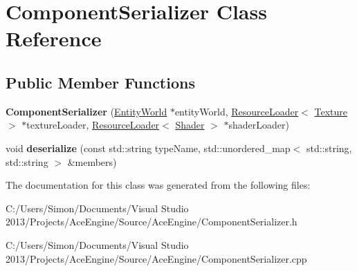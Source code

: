 \hypertarget{class_component_serializer}{}\section{Component\+Serializer Class Reference}
\label{class_component_serializer}
\subsection*{Public Member Functions}
\begin{DoxyCompactItemize}
\item 
\hypertarget{class_component_serializer_ab5fd892a3aef23f30339b3eda3494f31}{}{\bfseries Component\+Serializer} (\hyperlink{class_entity_world}{Entity\+World} $\ast$entity\+World, \hyperlink{class_resource_loader}{Resource\+Loader}$<$ \hyperlink{struct_texture}{Texture} $>$ $\ast$texture\+Loader, \hyperlink{class_resource_loader}{Resource\+Loader}$<$ \hyperlink{struct_shader}{Shader} $>$ $\ast$shader\+Loader)\label{class_component_serializer_ab5fd892a3aef23f30339b3eda3494f31}

\item 
\hypertarget{class_component_serializer_ab0bfc10077164ec952d42ffd91c85807}{}void {\bfseries deserialize} (const std\+::string type\+Name, std\+::unordered\+\_\+map$<$ std\+::string, std\+::string $>$ \&members)\label{class_component_serializer_ab0bfc10077164ec952d42ffd91c85807}

\end{DoxyCompactItemize}


The documentation for this class was generated from the following files\+:\begin{DoxyCompactItemize}
\item 
C\+:/\+Users/\+Simon/\+Documents/\+Visual Studio 2013/\+Projects/\+Ace\+Engine/\+Source/\+Ace\+Engine/Component\+Serializer.\+h\item 
C\+:/\+Users/\+Simon/\+Documents/\+Visual Studio 2013/\+Projects/\+Ace\+Engine/\+Source/\+Ace\+Engine/Component\+Serializer.\+cpp\end{DoxyCompactItemize}
